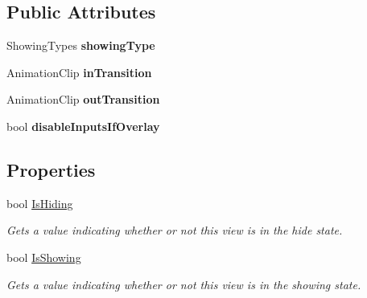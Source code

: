 \subsection*{Public Attributes}
\begin{DoxyCompactItemize}
\item 
\hypertarget{class_scaffolding_1_1_abstract_view_a7a3bdf62bce105b7857671d30adb179b}{Showing\-Types {\bfseries showing\-Type}}\label{class_scaffolding_1_1_abstract_view_a7a3bdf62bce105b7857671d30adb179b}

\item 
\hypertarget{class_scaffolding_1_1_abstract_view_addde808d8caa8a49014303bf1dcc1f8e}{Animation\-Clip {\bfseries in\-Transition}}\label{class_scaffolding_1_1_abstract_view_addde808d8caa8a49014303bf1dcc1f8e}

\item 
\hypertarget{class_scaffolding_1_1_abstract_view_aa62967668127d7526d2bca78e1e1501b}{Animation\-Clip {\bfseries out\-Transition}}\label{class_scaffolding_1_1_abstract_view_aa62967668127d7526d2bca78e1e1501b}

\item 
\hypertarget{class_scaffolding_1_1_abstract_view_ae03980c52528bdb18b92932bb1f17e7b}{bool {\bfseries disable\-Inputs\-If\-Overlay}}\label{class_scaffolding_1_1_abstract_view_ae03980c52528bdb18b92932bb1f17e7b}

\end{DoxyCompactItemize}
\subsection*{Properties}
\begin{DoxyCompactItemize}
\item 
bool \hyperlink{class_scaffolding_1_1_abstract_view_a162a5103cff0b5aa7938715e1a84ad61}{Is\-Hiding}
\begin{DoxyCompactList}\small\item\em Gets a value indicating whether or not this view is in the hide state. \end{DoxyCompactList}\item 
bool \hyperlink{class_scaffolding_1_1_abstract_view_ac933ea22f4d4b9e511f872d53d37a544}{Is\-Showing}
\begin{DoxyCompactList}\small\item\em Gets a value indicating whether or not this view is in the showing state. \end{DoxyCompactList}\end{DoxyCompactItemize}


